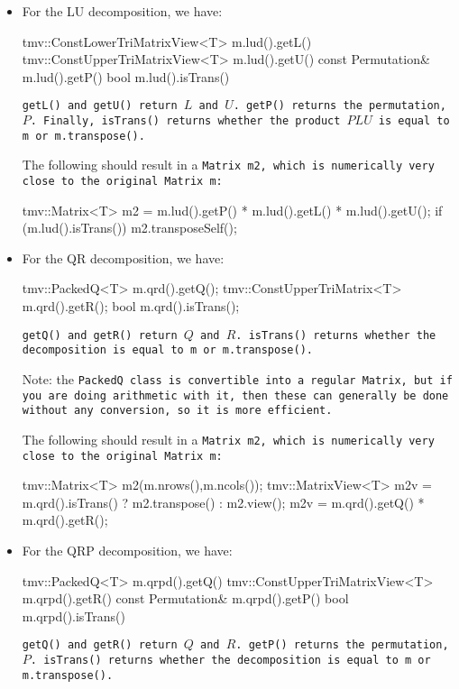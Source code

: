 \begin{itemize}
\item
For the LU decomposition, we have:
\begin{tmvcode}
tmv::ConstLowerTriMatrixView<T> m.lud().getL()
tmv::ConstUpperTriMatrixView<T> m.lud().getU()
const Permutation& m.lud().getP()
bool m.lud().isTrans()
\end{tmvcode}
\tt{getL()} and \tt{getU()} return $L$ and $U$.
\tt{getP()} returns the permutation, $P$.
Finally, \tt{isTrans()} returns whether
the product $PLU$ is equal to \tt{m} or \tt{m.transpose()}.  

The following should result in a \tt{Matrix m2}, which is numerically very close to
the original \tt{Matrix m}:
\begin{tmvcode}
tmv::Matrix<T> m2 = m.lud().getP() * m.lud().getL() * m.lud().getU();
if (m.lud().isTrans()) m2.transposeSelf();
\end{tmvcode}

\item
For the QR decomposition, we have:
\begin{tmvcode}
tmv::PackedQ<T> m.qrd().getQ();
tmv::ConstUpperTriMatrix<T> m.qrd().getR();
bool m.qrd().isTrans();
\end{tmvcode}
\tt{getQ()} and \tt{getR()} return $Q$ and $R$.  
\tt{isTrans()} returns whether
the decomposition is equal to \tt{m} or \tt{m.transpose()}.  

Note: the \tt{PackedQ} class is convertible into a regular \tt{Matrix}, but if you are doing 
arithmetic with it, then these can generally be done without any conversion,
so it is more efficient.

The following should result in a \tt{Matrix m2}, which is numerically very close to
the original \tt{Matrix m}:
\begin{tmvcode}
tmv::Matrix<T> m2(m.nrows(),m.ncols());
tmv::MatrixView<T> m2v = 
      m.qrd().isTrans() ? m2.transpose() : m2.view();
m2v = m.qrd().getQ() * m.qrd().getR();
\end{tmvcode}

\item
For the QRP decomposition, we have:
\begin{tmvcode}
tmv::PackedQ<T> m.qrpd().getQ()
tmv::ConstUpperTriMatrixView<T> m.qrpd().getR()
const Permutation& m.qrpd().getP()
bool m.qrpd().isTrans()
\end{tmvcode}
\tt{getQ()} and \tt{getR()} return $Q$ and $R$.
\tt{getP()} returns the permutation, $P$.
\tt{isTrans()} returns whether
the decomposition is equal to \tt{m} or \tt{m.transpose()}.  


\end{itemize}
